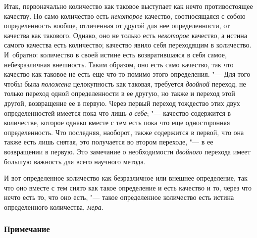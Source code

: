 Итак, первоначально количество как таковое выступает как нечто
противостоящее качеству. Но само количество есть
{\em некоторое} качество, соотносящаяся с собою
определенность вообще, отличенная от другой для нее определенности, от
качества как такового. Однако, оно не только есть
{\em некоторое} качество, а истина самого качества есть
количество; качество явило себя переходящим в количество. И~обратно:
количество в своей истине есть возвратившаяся в себя самое, небезразличная
внешность. Таким образом, оно есть само качество, так что качество как
таковое не есть еще что-то помимо этого определения. "--- Для того чтобы была
{\em положена} целокупность как таковая, требуется
{\em двойной} переход, не только переход одной
определенности в ее другую, но также и переход этой другой, возвращение ее
в первую. Через первый переход тождество этих двух определенностей имеется
пока что лишь {\em в себе}; "--- качество содержится в
количестве, которое однако вместе с тем есть пока что еще односторонняя
определенность. Что последняя, наоборот, также содержится в первой, что она
также есть лишь снятая, это получается во втором переходе, "--- в ее
возвращении в первую. Это замечание о необходимости
{\em двойного} перехода имеет большую важность для всего научного метода.

И вот определенное количество как безразличное или внешнее определение, так
что оно вместе с тем снято как такое
определение
и есть качество и то, через что нечто есть то, что оно есть, "--- такое
определенное количество есть истина определенного количества, {\em мера}.


\subsubsection[Примечание]{Примечание}

